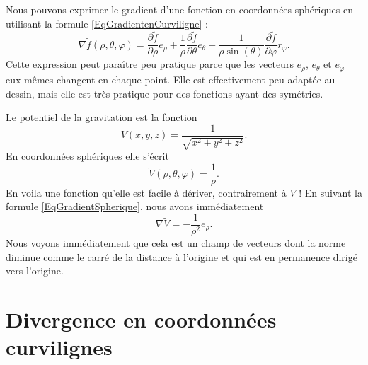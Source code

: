 Nous pouvons exprimer le gradient d'une fonction en coordonnées sphériques en utilisant la formule \eqref{EqGradientenCurviligne} :
\begin{equation}        \label{EqGradientSpherique}
    \nabla\tilde f(\rho,\theta,\varphi)=\frac{ \partial \tilde f }{ \partial \rho }e_{\rho}+\frac{1}{ \rho }\frac{ \partial \tilde f }{ \partial \theta }e_{\theta}+\frac{1}{ \rho\sin(\theta) }\frac{ \partial \tilde f }{ \partial \varphi }r_{\varphi}.
\end{equation}
Cette expression peut paraître peu pratique parce que les vecteurs $e_{\rho}$, $e_{\theta}$ et $e_{\varphi}$ eux-mêmes changent en chaque point. Elle est effectivement peu adaptée au dessin, mais elle est très pratique pour des fonctions ayant des symétries.

\begin{example}
    Le potentiel de la gravitation est la fonction
    \begin{equation}
        V(x,y,z)=\frac{1}{ \sqrt{x^2+y^2+z^2} }.
    \end{equation}
    En coordonnées sphériques elle s'écrit
    \begin{equation}
        \tilde V(\rho,\theta,\varphi)=\frac{1}{ \rho }.
    \end{equation}
    En voila une fonction qu'elle est facile à dériver, contrairement à $V$ ! En suivant la formule \eqref{EqGradientSpherique}, nous avons immédiatement
    \begin{equation}
        \nabla\tilde V=-\frac{1}{ \rho^2 }e_{\rho}.
    \end{equation}
    Nous voyons immédiatement que cela est un champ de vecteurs dont la norme diminue comme le carré de la distance à l'origine et qui est en permanence dirigé vers l'origine.
\end{example}


\section{Divergence en coordonnées curvilignes}

